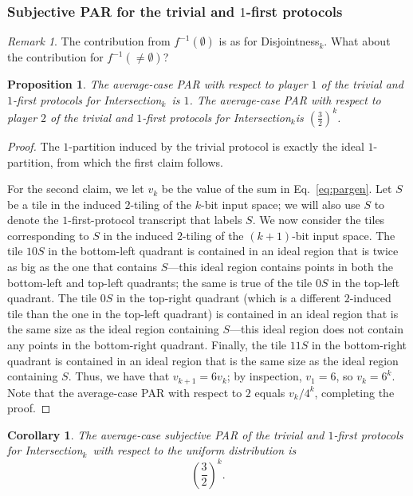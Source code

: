 \documentclass{article}
\theoremstyle{theorem}
\newtheorem{cor}[theorem]{Corollary}
\newtheorem{prop}[theorem]{Proposition}
\theoremstyle{definition}
\theoremstyle{remark}
\newtheorem{remark}[theorem]{Remark}
\newcommand{\disjoint}{{\sc Dis\-joint\-ness}\ensuremath{_k}}
\newcommand{\intersection}{{\sc In\-ter\-sec\-tion}\ensuremath{_k}}
\begin{document}
\subsubsection{Subjective PAR for the trivial and $1$-first protocols}

\begin{remark}
The contribution from $f^{-1}(\emptyset)$ is as for \disjoint.  What about the contribution for $f^{-1}(\neq\emptyset)$?
\end{remark}

\begin{prop}
The average-case PAR with respect to player $1$ of the trivial and $1$-first protocols for \intersection\ is $1$.  The average-case PAR with respect to player $2$ of the trivial and $1$-first protocols for \intersection is $\left(\frac{3}{2}\right)^k$.
\end{prop}
\begin{proof}
The $1$-partition induced by the trivial protocol is exactly the ideal $1$-partition, from which the first claim follows.

For the second claim, we let $v_k$ be the value of the sum in Eq.~\ref{eq:pargen}.  Let $S$ be a tile in the induced $2$-tiling of the $k$-bit input space; we will also use $S$ to denote the $1$-first-protocol transcript that labels $S$.  We now consider the tiles corresponding to $S$ in the induced $2$-tiling of the $(k+1)$-bit input space.  The tile $10S$ in the bottom-left quadrant is contained in an ideal region that is twice as big as the one that contains $S$---this ideal region contains points in both the bottom-left and top-left quadrants; the same is true of the tile $0S$ in the top-left quadrant.  The tile $0S$ in the top-right quadrant (which is a different $2$-induced tile than the one in the top-left quadrant) is contained in an ideal region that is the same size as the ideal region containing $S$---this ideal region does not contain any points in the bottom-right quadrant.  Finally, the tile $11S$ in the bottom-right quadrant is contained in an ideal region that is the same size as the ideal region containing $S$.  Thus, we have that $v_{k+1} = 6v_k$; by inspection, $v_1=6$, so $v_k = 6^k$.  Note that the average-case PAR with respect to $2$ equals $v_k/4^k$, completing the proof.
\end{proof}

\begin{cor}
The average-case subjective PAR of the trivial and $1$-first protocols for \intersection\ with respect to the uniform distribution is
\[
\left(\frac{3}{2}\right)^k.
\]
\end{cor}
\end{document}
